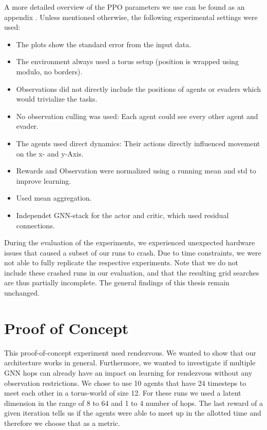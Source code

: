 A more detailed overview of the PPO parameters we use can be found as an appendix . Unless mentioned otherwise, the following experimental settings were used:
\begin{itemize}[noitemsep,nolistsep]
    \item The plots show the standard error from the input data.
    \item The environment always used a torus setup (position is wrapped using modulo, no borders).
    \item Observations did not directly include the positions of agents or evaders which would trivialize the tasks.
    \item No observation culling was used: Each agent could see every other agent and evader.
    \item The agents used direct dynamics: Their actions directly influenced movement on the x- and y-Axis.
    \item Rewards and Observation were normalized using a running mean and std to improve learning.
    \item Used mean aggregation.
    \item Independet GNN-stack for the actor and critic, which used residual connections.
\end{itemize} \par

During the evaluation of the experiments, we experienced unexpected hardware issues that caused a subset of our runs to crash. Due to time constraints, we were not able to fully replicate the respective experiments. Note that we do not include these crashed runs in our evaluation, and that the resulting grid searches are thus partially incomplete. The general findings of this thesis remain unchanged. \par



\section{Proof of Concept}
\label{sec:Proof of Concept}
This proof-of-concept experiment used rendezvous. We wanted to show that our architecture works in general. Furthermore, we wanted to investigate if multiple GNN hops can already have an impact on learning for rendezvous without any observation restrictions. We chose to use 10 agents that have 24 timesteps to meet each other in a torus-world of size 12. For these runs we used a latent dimension in the range of 8 to 64 and 1 to 4 number of hops. The last reward of a given iteration tells us if the agents were able to meet up in the allotted time and therefore we choose that as a metric.

